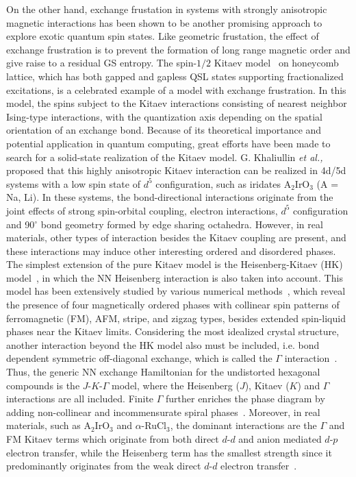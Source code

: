 \documentclass[aps,prb,reprint,amsfonts,amsmath,amssymb,showpacs,groupedaddress,superscriptaddress]{revtex4-1}
\begin{document}
On the other hand, exchange frustation in systems with strongly anisotropic magnetic interactions has been shown to be another promising approach to explore exotic quantum spin states. Like geometric frustation, the effect of exchange frustration is to prevent the formation of long range magnetic order and give raise to a residual GS entropy. The spin-$1/2$ Kitaev model~\cite{Kitaev2006} on honeycomb lattice, which has both gapped and gapless QSL states supporting fractionalized excitations, is a celebrated example of a model with exchange frustration. In this model, the spins subject to the Kitaev interactions consisting of nearest neighbor Ising-type interactions, with the quantization axis depending on the spatial orientation of an exchange bond. Because of its theoretical importance and potential application in quantum computing, great efforts have been made to search for a solid-state realization of the Kitaev model. G. Khaliullin \emph{et al.,}~\cite{Khaliullin2005,PhysRevLett.102.017205} proposed that this highly anisotropic Kitaev interaction can be realized in 4d/5d systems with a low spin state of $d^5$ configuration, such as iridates A$_2$IrO$_3$ (A = Na, Li). In these systems, the bond-directional interactions originate from the joint effects of strong spin-orbital coupling, electron interactions, $d^5$ configuration and 90$^\circ$ bond geometry formed by edge sharing octahedra. However, in real materials, other types of interaction besides the Kitaev coupling are present, and these interactions may induce other interesting ordered and disordered phases. The simplest extension of the pure Kitaev model is the Heisenberg-Kitaev (HK) model~\cite{PhysRevLett.105.027204,10.1146/annurev-conmatphys-033117-053934}, in which the NN Heisenberg interaction is also taken into account. This model has been extensively studied by various numerical methods~\cite{PhysRevLett.110.097204,PhysRevB.83.245104,PhysRevB.84.100406,PhysRevB.90.195102,PhysRevLett.119.157203}, which reveal the presence of four magnetically ordered phases with collinear spin patterns of ferromagnetic (FM), AFM, stripe, and zigzag types, besides extended spin-liquid phases near the Kitaev limits. Considering the most idealized crystal structure, another interaction beyond the HK model also must be included, i.e. bond dependent symmetric off-diagonal exchange, which is called the $\Gamma$ interaction~\cite{PhysRevLett.112.077204,PhysRevB.93.214431,PhysRevB.96.115103}. Thus, the generic NN exchange Hamiltonian for the undistorted hexagonal compounds is the $J$-$K$-$\Gamma$ model, where the Heisenberg ($J$), Kitaev ($K$) and $\Gamma$ interactions are all included. Finite $\Gamma$ further enriches the phase diagram by adding non-collinear and incommensurate spiral phases~\cite{PhysRevLett.112.077204,Winter_2017,10.1038/s42254-019-0038-2}. Moreover, in real materials, such as A$_2$IrO$_3$ and $\alpha$-RuCl$_{3}$, the dominant interactions are the $\Gamma$ and FM Kitaev terms which originate from both direct $d$-$d$ and anion mediated $d$-$p$ electron transfer, while the Heisenberg term has the smallest strength since it predominantly originates from the weak direct $d$-$d$ electron transfer~\cite{PhysRevB.93.214431,PhysRevB.96.115103}.
\end{document}
